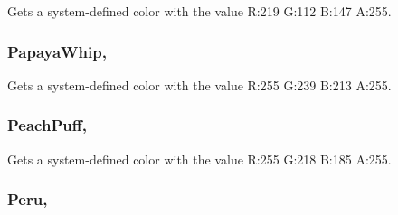 Gets a system-\/defined color with the value R\+:219 G\+:112 B\+:147 A\+:255.

\hypertarget{structMicrosoft_1_1Xna_1_1Framework_1_1Color_aa02776ad5ff7fcb6877f48dfecc83d1a}{}
\subsubsection[{Papaya\+Whip}]{ Papaya\+Whip\hspace{0.3cm}{\ttfamily [static]}, {\ttfamily [get]}}\label{structMicrosoft_1_1Xna_1_1Framework_1_1Color_aa02776ad5ff7fcb6877f48dfecc83d1a}


Gets a system-\/defined color with the value R\+:255 G\+:239 B\+:213 A\+:255.

\hypertarget{structMicrosoft_1_1Xna_1_1Framework_1_1Color_adb9b6b6cd4cb596511b686cee3b006f3}{}
\subsubsection[{Peach\+Puff}]{ Peach\+Puff\hspace{0.3cm}{\ttfamily [static]}, {\ttfamily [get]}}\label{structMicrosoft_1_1Xna_1_1Framework_1_1Color_adb9b6b6cd4cb596511b686cee3b006f3}


Gets a system-\/defined color with the value R\+:255 G\+:218 B\+:185 A\+:255.

\hypertarget{structMicrosoft_1_1Xna_1_1Framework_1_1Color_a36e5c7e5c45475fd4b0ef0d24c5a6a72}{}
\subsubsection[{Peru}]{ Peru\hspace{0.3cm}{\ttfamily [static]}, {\ttfamily [get]}}\label{structMicrosoft_1_1Xna_1_1Framework_1_1Color_a36e5c7e5c45475fd4b0ef0d24c5a6a72}


